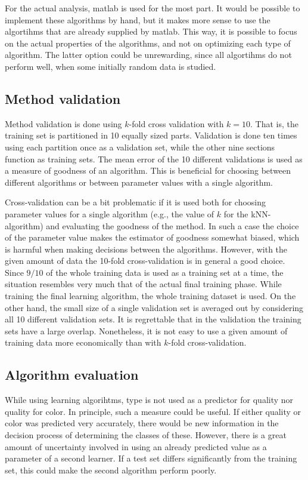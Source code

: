 \documentclass[twoside]{article}
\begin{document}
\begin{multicols}{2}
For the actual analysis, matlab is used for the most part. It would be possible to implement these algorithms by hand,
but it makes more sense to use the algortihms that are already supplied by matlab. This way, it is possible to focus
on the actual properties of the algorithms, and not on optimizing each type of algorithm. The latter option could be
unrewarding, since all algortihms do not perform well, when some initially random data is studied.

\subsection{Method validation}

Method validation is done using $k$-fold cross validation with $k = 10$. That is, the training set is partitioned in 10 equally sized parts. 
Validation is done ten times using each partition once as a validation set, while the other nine
sections function as training sets. The mean error of the 10 different validations is used as a measure
of goodness of an algorithm. This is beneficial for choosing between different algorithms or
between parameter values with a single algorithm.

Cross-validation can be a bit problematic if it is used both for choosing parameter values for a single algorithm (e.g., the value of $k$
for the kNN-algorithm) and evaluating the goodness of the method. In such a case the choice of the parameter value makes the estimator
of goodness somewhat biased, which is harmful when making decisions between the algorithms. However, with the given amount of data
the 10-fold cross-validation is in general a good choice. Since $9/10$ of the whole training data is used as a training set at a time,
the situation resembles very much that of the actual final training phase. While training the final learning algorithm, the whole training dataset
is used. On the other hand, the small size of a single validation set is averaged out by considering all 10 different validation sets.
It is regrettable that in the validation the training sets have a large overlap. Nonetheless, it is not easy to use a given amount
of training data more economically than with $k$-fold cross-validation.

\subsection{Algorithm evaluation}

While using learning algorihtms, type is not used as a predictor for quality nor quality for color.
In principle, such a measure could be useful. If either quality or color was predicted very
accurately, there would be new information in the decision process of determining the classes of these.
However, there is a great amount of uncertainty involved in using an already predicted value as a
parameter of a second learner. If a test set differs significantly from the training set, this could
make the second algorithm perform poorly.


\end{multicols}
\end{document}
